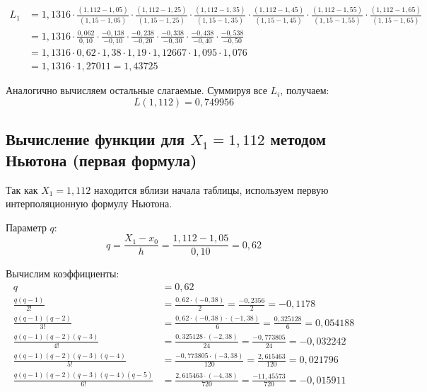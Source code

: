 \begin{align*}
L_1 &= 1{,}1316 \cdot \frac{(1{,}112-1{,}05)}{(1{,}15-1{,}05)} \cdot \frac{(1{,}112-1{,}25)}{(1{,}15-1{,}25)} \cdot \frac{(1{,}112-1{,}35)}{(1{,}15-1{,}35)} \cdot \frac{(1{,}112-1{,}45)}{(1{,}15-1{,}45)} \cdot \frac{(1{,}112-1{,}55)}{(1{,}15-1{,}55)} \cdot \frac{(1{,}112-1{,}65)}{(1{,}15-1{,}65)} \\
&= 1{,}1316 \cdot \frac{0{,}062}{0{,}10} \cdot \frac{-0{,}138}{-0{,}10} \cdot \frac{-0{,}238}{-0{,}20} \cdot \frac{-0{,}338}{-0{,}30} \cdot \frac{-0{,}438}{-0{,}40} \cdot \frac{-0{,}538}{-0{,}50} \\
&= 1{,}1316 \cdot 0{,}62 \cdot 1{,}38 \cdot 1{,}19 \cdot 1{,}12667 \cdot 1{,}095 \cdot 1{,}076 \\
&= 1{,}1316 \cdot 1{,}27011 = 1{,}43725
\end{align*}

Аналогично вычисляем остальные слагаемые. Суммируя все $L_i$, получаем:
\[
\boxed{L(1{,}112) = 0{,}749956}
\]

\subsection{Вычисление функции для $X_1 = 1{,}112$ методом Ньютона (первая формула)}

Так как $X_1 = 1{,}112$ находится вблизи начала таблицы, используем первую интерполяционную формулу Ньютона.

Параметр $q$:
\[
q = \frac{X_1 - x_0}{h} = \frac{1{,}112 - 1{,}05}{0{,}10} = 0{,}62
\]

Вычислим коэффициенты:
\begin{align*}
q &= 0{,}62 \\
\frac{q(q-1)}{2!} &= \frac{0{,}62 \cdot (-0{,}38)}{2} = \frac{-0{,}2356}{2} = -0{,}1178 \\
\frac{q(q-1)(q-2)}{3!} &= \frac{0{,}62 \cdot (-0{,}38) \cdot (-1{,}38)}{6} = \frac{0{,}325128}{6} = 0{,}054188 \\
\frac{q(q-1)(q-2)(q-3)}{4!} &= \frac{0{,}325128 \cdot (-2{,}38)}{24} = \frac{-0{,}773805}{24} = -0{,}032242 \\
\frac{q(q-1)(q-2)(q-3)(q-4)}{5!} &= \frac{-0{,}773805 \cdot (-3{,}38)}{120} = \frac{2{,}615463}{120} = 0{,}021796 \\
\frac{q(q-1)(q-2)(q-3)(q-4)(q-5)}{6!} &= \frac{2{,}615463 \cdot (-4{,}38)}{720} = \frac{-11{,}45573}{720} = -0{,}015911
\end{align*}

